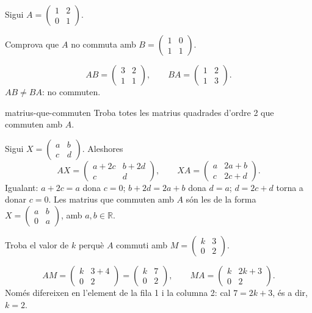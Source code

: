Sigui $A=\begin{pmatrix}1&2\\0&1\end{pmatrix}$.

\begin{apartats}

Comprova que $A$ no commuta amb $B=\begin{pmatrix}1&0\\1&1\end{pmatrix}$.

\begin{solucio}
\[
AB=\begin{pmatrix}3&2\\1&1\end{pmatrix},\qquad BA=\begin{pmatrix}1&2\\1&3\end{pmatrix}.
\]
$AB\ne BA$: no commuten.
\end{solucio}

\begin{tria}{matrius-que-commuten}
Troba totes les matrius quadrades d'ordre 2 que commuten amb $A$.

\begin{solucio}
Sigui $X=\begin{pmatrix}a&b\\c&d\end{pmatrix}$. Aleshores
\[
AX=\begin{pmatrix}a+2c&b+2d\\c&d\end{pmatrix},\qquad XA=\begin{pmatrix}a&2a+b\\c&2c+d\end{pmatrix}.
\]
Igualant: $a+2c=a$ dona $c=0$; $b+2d=2a+b$ dona $d=a$; $d=2c+d$ torna a donar $c=0$. Les matrius que
commuten amb $A$ són les de la forma $X=\begin{pmatrix}a&b\\0&a\end{pmatrix}$, amb $a,b\in\mathbb R$.
\end{solucio}

Troba el valor de $k$ perquè $A$ commuti amb $M=\begin{pmatrix}k&3\\0&2\end{pmatrix}$.

\begin{solucio}
\[
AM=\begin{pmatrix}k&3+4\\0&2\end{pmatrix}=\begin{pmatrix}k&7\\0&2\end{pmatrix},\qquad
MA=\begin{pmatrix}k&2k+3\\0&2\end{pmatrix}.
\]
Només difereixen en l'element de la fila 1 i la columna 2: cal $7=2k+3$, és a dir, $k=2$.
\end{solucio}
\end{tria}


\end{apartats}
